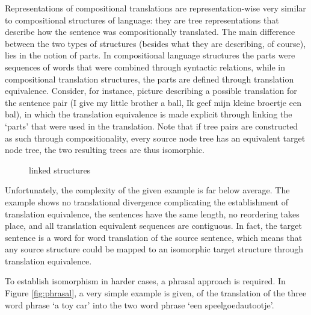 \documentclass{report}
\theoremstyle{break}
\begin{document}
Representations of compositional translations are representation-wise very similar to compositional structures of language: they are tree representations that describe how the sentence was compositionally translated. The main difference between the two types of structures (besides what they are describing, of course), lies in the notion of parts. In compositional language structures the parts were sequences of words that were combined through syntactic relations, while in compositional translation structures, the parts are defined through translation equivalence. Consider, for instance, picture describing a possible translation for the sentence pair (I give my little brother a ball, Ik geef mijn kleine broertje een bal), in which the translation equivalence is made explicit through linking the  `parts' that were used in the translation. Note that if tree pairs are constructed as such through compositionality, every source node tree has an equivalent target node tree, the two resulting trees are thus isomorphic. %

\begin{figure}[!ht]

\caption{linked structures}\label{fig:transtrees}
\end{figure}

Unfortunately, the complexity of the given example is far below average. The example shows no translational divergence complicating the establishment of translation equivalence, the sentences have the same length, no reordering takes place, and all translation equivalent sequences are contiguous. In fact, the target sentence is a word for word translation of the source sentence, which means that any source structure could be mapped to an isomorphic target structure through translation equivalence.

To establish isomorphism in harder cases, a phrasal approach is required. In Figure \ref{fig:phrasal}, a very simple example is given, of the translation of the three word phrase `a toy car' into the two word phrase `een speelgoedautootje'.
\end{document}
